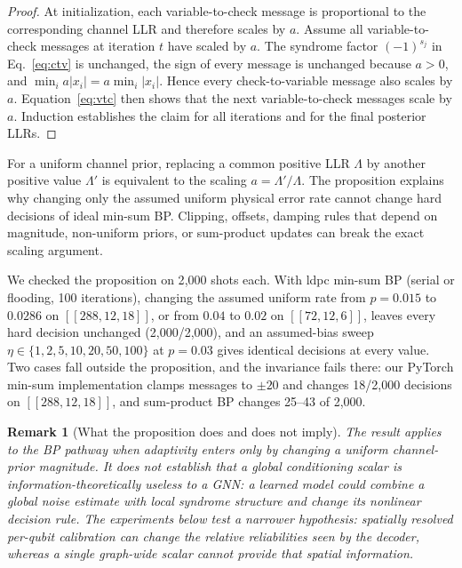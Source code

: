 \documentclass[a4paper,twocolumn,11pt,nopdfoutputerror]{quantumarticle}
\newcommand{\code}[3]{\ensuremath{[\![#1,#2,#3]\!]}}
\newtheorem{remark}{Remark}
\begin{document}
\begin{proof}
At initialization, each variable-to-check message is proportional to the
corresponding channel LLR and therefore scales by $a$. Assume all
variable-to-check messages at iteration $t$ have scaled by $a$. The
syndrome factor $(-1)^{s_j}$ in Eq.~\eqref{eq:ctv} is unchanged, the sign
of every message is unchanged because $a>0$, and
$\min_i a|x_i|=a\min_i|x_i|$. Hence every check-to-variable message also
scales by $a$. Equation~\eqref{eq:vtc} then shows that the next
variable-to-check messages scale by $a$. Induction establishes the claim
for all iterations and for the final posterior LLRs.
\end{proof}

For a uniform channel prior, replacing a common positive LLR $\Lambda$
by another positive value $\Lambda'$ is equivalent to the scaling
$a=\Lambda'/\Lambda$. The proposition explains why changing only the assumed uniform physical
error rate cannot change hard decisions of ideal min-sum BP. Clipping, offsets, damping rules that depend on
magnitude, non-uniform priors, or sum-product updates can break the exact
scaling argument.

We checked the proposition on 2{,}000 shots each. With ldpc min-sum BP
(serial or flooding, 100 iterations), changing the assumed uniform rate
from $p=0.015$ to $0.0286$ on $\code{288}{12}{18}$, or from $0.04$ to
$0.02$ on $\code{72}{12}{6}$, leaves every hard decision unchanged
(2{,}000/2{,}000), and an assumed-bias sweep
$\eta\in\{1,2,5,10,20,50,100\}$ at $p=0.03$ gives identical decisions at
every value. Two cases fall outside the proposition, and the invariance
fails there: our PyTorch min-sum implementation clamps messages to
$\pm20$ and changes 18/2{,}000 decisions on $\code{288}{12}{18}$, and
sum-product BP changes 25--43 of 2{,}000.

\begin{remark}[What the proposition does and does not imply]
The result applies to the BP pathway when adaptivity enters only by
changing a uniform channel-prior magnitude. It does \emph{not} establish
that a global conditioning scalar is information-theoretically useless
to a GNN: a learned model could combine a global noise estimate with
local syndrome structure and change its nonlinear decision rule. The experiments below test a narrower hypothesis: spatially resolved
per-qubit calibration can change the relative reliabilities seen by the
decoder, whereas a single graph-wide scalar cannot provide that spatial
information.
\end{remark}
\end{document}
